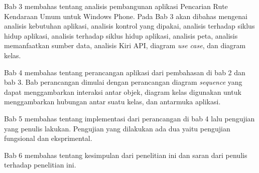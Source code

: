 Bab 3 membahas tentang analisis pembangunan aplikasi Pencarian Rute Kendaraan Umum untuk Windows Phone. Pada Bab 3 akan dibahas mengenai analisis kebutuhan aplikasi, analisis kontrol yang dipakai, analisis terhadap siklus hidup aplikasi, analisis terhadap siklus hidup aplikasi, analisis peta, analisis memanfaatkan sumber data, analisis Kiri API, diagram \textit{use case}, dan diagram kelas.

Bab 4 membahas tentang perancangan aplikasi dari pembahasan di bab 2 dan bab 3. Bab perancangan dimulai dengan perancangan diagram \textit{sequence} yang dapat menggambarkan interaksi antar objek, diagram kelas digunakan untuk menggambarkan hubungan antar suatu kelas, dan antarmuka aplikasi.

Bab 5 membahas tentang implementasi  dari perancangan di bab 4 lalu pengujian yang penulis lakukan. Pengujian yang dilakukan ada dua yaitu pengujian fungsional dan eksprimental. 

Bab 6 membahas tentang kesimpulan dari penelitian ini dan saran dari penulis terhadap penelitian ini.